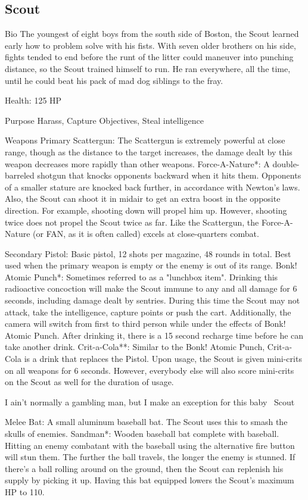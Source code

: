 \subsection{Scout}
Bio
The youngest of eight boys from the south side of Boston, the Scout learned early how to problem solve with his fists. With seven older brothers on his side, fights tended to end before the runt of the litter could maneuver into punching distance, so the Scout trained himself to run. He ran everywhere, all the time, until he could beat his pack of mad dog siblings to the fray.

Health: 125 HP

Purpose
Harass, Capture Objectives, Steal intelligence

Weapons
Primary
Scattergun:  The Scattergun is extremely powerful at close range, though as the distance to the target increases, the damage dealt by this weapon decreases more rapidly than other weapons.
Force-A-Nature*: A double-barreled shotgun that knocks opponents backward when it hits them.  Opponents of a smaller stature are knocked back further, in accordance with Newton's laws.  Also, the Scout can shoot it in midair to get an extra boost in the opposite direction.  For example, shooting down will propel him up. However, shooting twice does not propel the Scout twice as far. Like the Scattergun, the Force-A-Nature (or FAN, as it is often called) excels at close-quarters combat.

Secondary
Pistol: Basic pistol, 12 shots per magazine, 48 rounds in total. Best used when the primary weapon is empty or the enemy is out of its range.
Bonk! Atomic Punch*: Sometimes referred to as a "lunchbox item". Drinking this radioactive concoction will make the Scout immune to any and all damage for 6 seconds, including damage dealt by sentries. During this time the Scout may not attack, take the intelligence, capture points or push the cart. Additionally, the camera will switch from first to third person while under the effects of Bonk! Atomic Punch. After drinking it, there is a 15 second recharge time before he can take another drink.
Crit-a-Cola**: Similar to the Bonk! Atomic Punch, Crit-a-Cola is a drink that replaces the Pistol.  Upon usage, the Scout is given mini-crits on all weapons for 6 seconds.  However, everybody else will also score mini-crits on the Scout as well for the duration of usage.

I ain't normally a gambling man, but I make an exception for this baby ~Scout

Melee
Bat: A small aluminum baseball bat. The Scout uses this to smash the skulls of enemies. 
Sandman*: Wooden baseball bat complete with baseball. Hitting an enemy combatant with the baseball using the alternative fire button will stun them. The further the ball travels, the longer the enemy is stunned. If there's a ball rolling around on the ground, then the Scout can replenish his supply by picking it up. Having this bat equipped lowers the Scout’s maximum HP to 110. 

